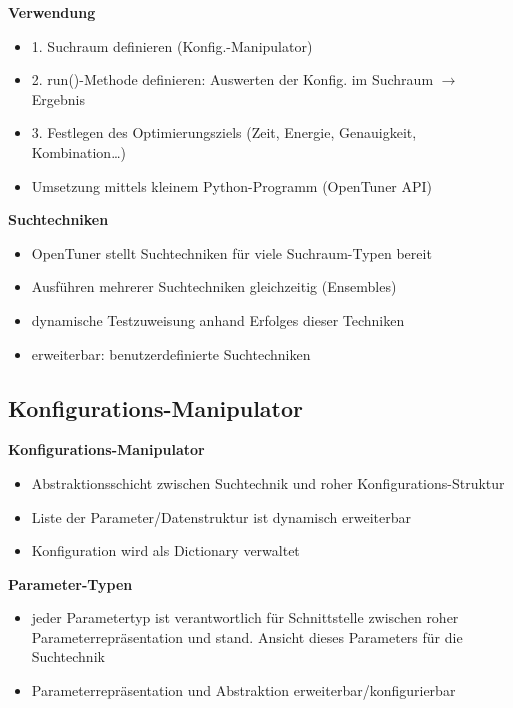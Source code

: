   \begin{frame}
  \textbf{Verwendung}
  \begin{itemize}
    \item 1. Suchraum definieren (Konfig.-Manipulator)
    \item 2. run()-Methode definieren: Auswerten der Konfig. im Suchraum $\rightarrow$ Ergebnis
    \item 3. Festlegen des Optimierungsziels (Zeit, Energie, Genauigkeit, Kombination…)
    \item Umsetzung mittels kleinem Python-Programm (OpenTuner API)
  \end{itemize}
  \textbf{Suchtechniken}
  \begin{itemize}
    \item OpenTuner stellt Suchtechniken für viele Suchraum-Typen bereit
    \item Ausführen mehrerer Suchtechniken gleichzeitig (Ensembles)
    \item dynamische Testzuweisung anhand Erfolges dieser Techniken
    \item erweiterbar: benutzerdefinierte Suchtechniken
  \end{itemize}
  \end{frame}
  

  \subsection{Konfigurations-Manipulator}

  \begin{frame}
  \textbf{Konfigurations-Manipulator}
  \begin{itemize}
    \item Abstraktionsschicht zwischen Suchtechnik und roher Konfigurations-Struktur
    \item Liste der Parameter/Datenstruktur ist dynamisch erweiterbar
    \item Konfiguration wird als Dictionary verwaltet \newline
  \end{itemize}
  \textbf{Parameter-Typen}
  \begin{itemize}
    \item jeder Parametertyp ist verantwortlich für Schnittstelle zwischen roher 
    Parameterrepräsentation und stand. Ansicht dieses Parameters für die Suchtechnik
    \item Parameterrepräsentation und Abstraktion erweiterbar/konfigurierbar
  \end{itemize}
  \end{frame}
  

